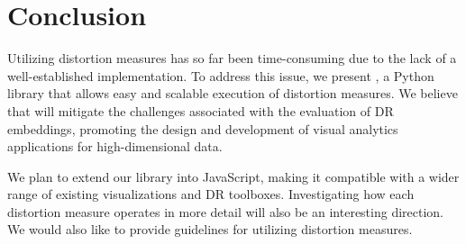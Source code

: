 \section{Conclusion}

Utilizing distortion measures has so far been time-consuming due to the lack of a well-established implementation.
To address this issue, we present \library, a Python library that allows easy and scalable execution of distortion measures. 
We believe that \library will mitigate the challenges associated with the evaluation of DR embeddings, promoting the design and development of visual analytics applications for high-dimensional data. 

We plan to extend our library into JavaScript, making it compatible with a wider range of existing visualizations \cite{bostock11tvcg} and DR \cite{cutura20vis} toolboxes. Investigating how each distortion measure operates in more detail will also be an interesting direction. We would also like to provide guidelines for utilizing distortion measures.